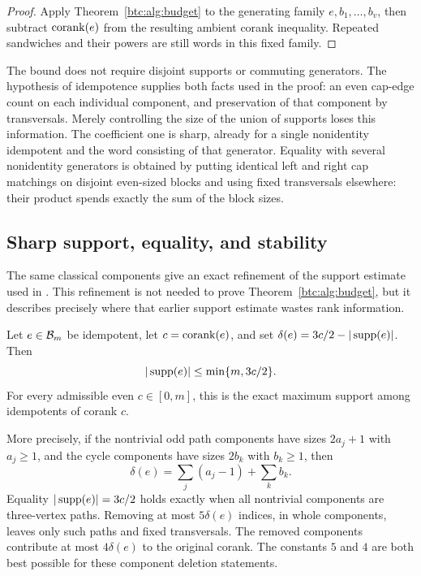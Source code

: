 \begin{proof}
Apply Theorem~\ref{btc:alg:budget} to the generating family
$e,b_1,\ldots,b_v$, then subtract $\operatorname{corank}(e)$ from the resulting
ambient corank inequality. Repeated sandwiches and their powers are
still words in this fixed family.
\end{proof}

\begin{remark}
The bound does not require disjoint supports or commuting generators.
The hypothesis of idempotence supplies both facts used in the proof:
an even cap-edge count on each individual component, and preservation
of that component by transversals. Merely controlling the size of the
union of supports loses this information.
The coefficient one is sharp, already for a single nonidentity
idempotent and the word consisting of that generator. Equality with
several nonidentity generators is obtained by putting identical
left and right cap matchings on disjoint even-sized blocks and
using fixed transversals elsewhere: their product spends exactly
the sum of the block sizes.
\end{remark}

\subsection{Sharp support, equality, and stability}
\label{btc:alg:support-section}

The same classical components give an exact refinement of the support
estimate used in \cite{OpenAILiveness2026}. This refinement is not
needed to prove Theorem~\ref{btc:alg:budget}, but it describes precisely
where that earlier support estimate wastes rank information.

\begin{theorem}\label{btc:alg:support}
Let $e\in\mathcal{B}_{m}$ be idempotent, let $c=\operatorname{corank}(e)$, and set
$\delta(e)=3c/2-|\operatorname{supp}(e)|$. Then
\begin{equation}\label{btc:alg:support-bound}
 |\operatorname{supp}(e)|\le\min\{m,3c/2\}.
\end{equation}
For every admissible even $c\in[0,m]$, this is the exact maximum
support among idempotents of corank $c$.

More precisely, if the nontrivial odd path components have sizes
$2a_j+1$ with $a_j\ge1$, and the cycle components have sizes $2b_k$
with $b_k\ge1$, then
\begin{equation}\label{btc:alg:deficit}
 \delta(e)=\sum_j(a_j-1)+\sum_k b_k.
\end{equation}
Equality $|\operatorname{supp}(e)|=3c/2$ holds exactly when all nontrivial
components are three-vertex paths. Removing at most $5\delta(e)$
indices, in whole components, leaves only such paths and fixed
transversals. The removed components contribute at most
$4\delta(e)$ to the original corank. The constants $5$ and $4$
are both best possible for these component deletion statements.
\end{theorem}

